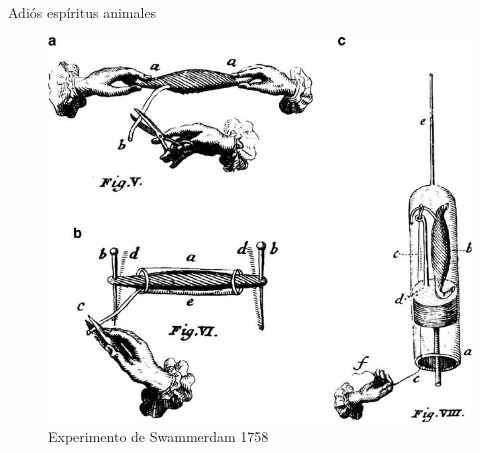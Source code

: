 \documentclass{beamer}
\begin{document}
\begin{frame}{Adiós espíritus animales}
\begin{figure}
    \centering
    \includegraphics[width=0.65\linewidth]{musculossw.jpg}
    \caption{Experimento de Swammerdam 1758}
    \label{fig:my_label}
\end{figure}
\end{frame}
\end{document}

